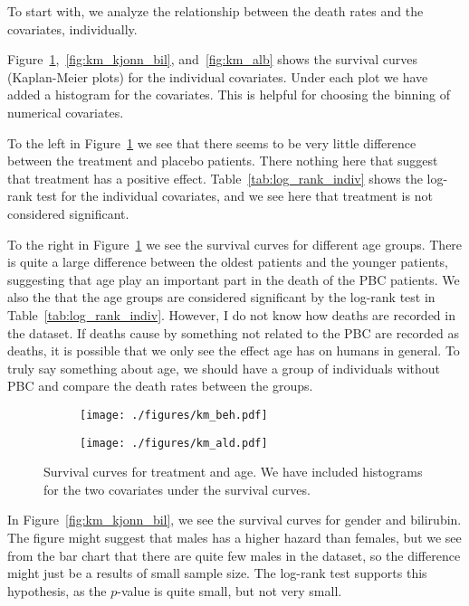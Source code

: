 \documentclass[11pt,a4paper]{article}
\begin{document}
To start with, we analyze the relationship between the death rates and the covariates, individually.

Figure~\ref{fig:km_beh_ald},~\ref{fig:km_kjonn_bil}, and~\ref{fig:km_alb} shows the survival curves (Kaplan-Meier plots) for the individual covariates. 
Under each plot we have added a histogram for the covariates. This is helpful for choosing the binning of numerical covariates.

To the left in Figure~\ref{fig:km_beh_ald} we see that there seems to be very little difference between the treatment and placebo patients. There nothing here that suggest that treatment has a positive effect. Table~\ref{tab:log_rank_indiv} shows the log-rank test for the individual covariates, and we see here that treatment is not considered significant.

To the right in Figure~\ref{fig:km_beh_ald} we see the survival curves for different age groups. There is quite a large difference between the oldest patients and the younger patients, suggesting that age play an important part in the death of the PBC patients. We also the that the age groups are considered significant by the log-rank test in Table~\ref{tab:log_rank_indiv}.
However, I do not know how deaths are recorded in the dataset. If deaths cause by something not related to the PBC are recorded as deaths, it is possible that we only see the effect age has on humans in general.  To truly say something about age, we should have a group of individuals without PBC and compare the death rates between the groups.
%
\begin{figure}[h!tbp]
    \centering
    \begin{subfigure}[b]{0.48\textwidth}
        \texttt{[image: ./figures/km\_beh.pdf]}
    \end{subfigure}%
    \quad
    \begin{subfigure}[b]{0.48\textwidth}
        \texttt{[image: ./figures/km\_ald.pdf]}
    \end{subfigure}
    \vspace{1\baselineskip}
    \caption{Survival curves for treatment and age. We have included histograms for the two covariates under the survival curves.}
    \label{fig:km_beh_ald}
\end{figure}

In Figure~\ref{fig:km_kjonn_bil}, we see the survival curves for gender and bilirubin. The figure might suggest that males has a higher hazard than females, but we see from the bar chart that there are quite few males in the dataset, so the difference might just be a results of small sample size. The log-rank test supports this hypothesis, as the $p$-value is quite small, but not very small.
\end{document}
